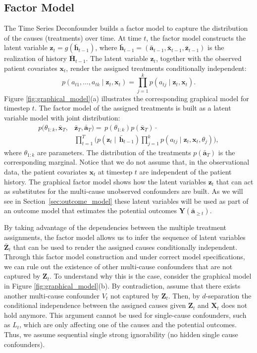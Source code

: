 \documentclass{article}
\newcommand{\vc}[1]{\mathbf{#1}}
\newcommand{\hist}[1]{\bar{\vc{#1}}}
\begin{document}
	\subsection{Factor Model} 
	
	The Time Series Deconfounder builds a factor model to capture the distribution of the causes (treatments) over time.  At time $t$, the factor model constructs the latent variable $\vc{z}_t = g(\hist{h}_{t-1})$, where $\hist{h}_{t-1} = (\hist{a}_{t-1}, \hist{x}_{t-1}, \hist{z}_{t-1})$ is the realization of history $\hist{H}_{t-1}$. The latent variable $\vc{z}_t$, together with the observed patient covariates $\vc{x}_t$, render the assigned treatments conditionally independent:
	\begin{equation}
		p(a_{t1}, \dots, a_{tk}\mid \vc{z}_t, \vc{x}_t) = \prod_{j=1}^{k} p(a_{tj} \mid \vc{z}_t, \vc{x}_t).
	\end{equation}
    Figure \ref{fig:graphical_model}(a) illustrates the corresponding graphical model for timestep $t$. The factor model of the assigned treatments is built as a latent variable model with joint distribution:
	\begin{equation}
	\begin{aligned}
	p(\theta_{1:k}, \hist{x}_{T}, & \hist{z}_{T},  \hist{a}_{T})  =   \, p(\theta_{1:k}) p(\hist{x}_T) \cdot \\
	& \prod_{t=1}^{T} \big(p(\vc{z}_{t}\mid  \, \hist{h}_{t-1}) \prod_{j=1}^{k} p(a_{tj} \mid \vc{z}_t, \vc{x}_t, \theta_j) \big), 
	\end{aligned}
	\end{equation}
	where $\theta_{1:k}$ are parameters. The distribution of the treatments $p(\hist{a}_{T})$ is the corresponding marginal. Notice that we do not assume that, in the observational data, the patient covariates $\vc{x}_t$ at timestep $t$ are independent of the patient history. The graphical factor model shows how the latent variables $\vc{z}_t$ that can act as substitutes for the multi-cause unobserved confounders are built. As we will see in Section~\ref{sec:outcome_model} these latent variables will be used as part of an outcome model that estimates the potential outcomes $\vc{Y}(\hist{a}_{\geq t})$. 

	
	By taking advantage of the dependencies between the multiple treatment assignments, the factor model allows us to infer the sequence of latent variables $\hist{Z}_t$ that can be used to render the assigned causes conditionally independent. Through this factor model construction and under correct model specifications, we can rule out the existence of other multi-cause confounders that are not captured by $\vc{Z}_t$. To understand why this is the case, consider the graphical model in  Figure \ref{fig:graphical_model}(b). By contradiction, assume that there exists another multi-cause confounder $V_t$ not captured by $\vc{Z}_t$. Then, by $d$-separation the conditional independence between the assigned causes given $\vc{Z}_t$ and $\vc{X}_t$ does not hold anymore. This argument cannot be used for single-cause confounders, such as $L_t$, which are only affecting one of the causes and the potential outcomes. Thus, we assume sequential single strong ignorability (no hidden single cause confounders). 
	
\end{document}
